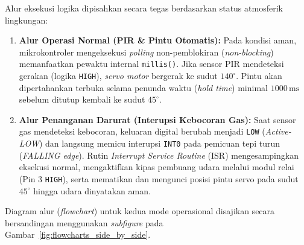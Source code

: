 Alur eksekusi logika dipisahkan secara tegas berdasarkan status atmosferik lingkungan:

\begin{enumerate}
	\item \textbf{Alur Operasi Normal (PIR \& Pintu Otomatis):} Pada kondisi aman, mikrokontroler mengeksekusi \textit{polling} non-pemblokiran (\textit{non-blocking}) memanfaatkan pewaktu internal \texttt{millis()}. Jika sensor PIR mendeteksi gerakan (logika \texttt{HIGH}), \textit{servo motor} bergerak ke sudut $140^\circ$. Pintu akan dipertahankan terbuka selama penunda waktu (\textit{hold time}) minimal $1000\,\text{ms}$ sebelum ditutup kembali ke sudut $45^\circ$.
	\item \textbf{Alur Penanganan Darurat (Interupsi Kebocoran Gas):} Saat sensor gas mendeteksi kebocoran, keluaran digital berubah menjadi \texttt{LOW} (\textit{Active-LOW}) dan langsung memicu interupsi \texttt{INT0} pada pemicuan tepi turun (\textit{FALLING edge}). Rutin \textit{Interrupt Service Routine} (ISR) mengesampingkan eksekusi normal, mengaktifkan kipas pembuang udara melalui modul relai (Pin 3 \texttt{HIGH}), serta mematikan dan mengunci posisi pintu servo pada sudut $45^\circ$ hingga udara dinyatakan aman.
\end{enumerate}

Diagram alur (\textit{flowchart}) untuk kedua mode operasional disajikan secara bersandingan menggunakan \textit{subfigure} pada Gambar~\ref{fig:flowcharts_side_by_side}.

